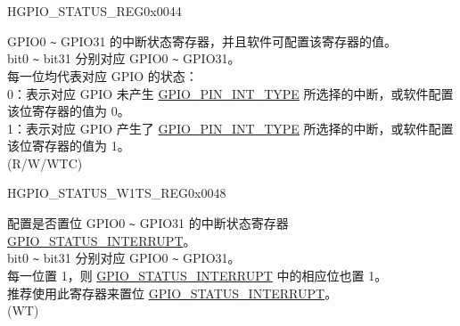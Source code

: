 \begin{register}{H}{GPIO\_STATUS\_REG}{0x0044}\label{regdesc:GPIOSTATUSREG}
%
\regnewline%
\begin{regdesc}\begin{reglist}
\label{fielddesc:GPIOSTATUSINTERRUPT}\item [GPIO\_STATUS\_INTERRUPT] GPIO0 \verb+~+ GPIO31 的中断状态寄存器，并且软件可配置该寄存器的值。\\
bit0 \verb+~+ bit31 分别对应 GPIO0 \verb+~+ GPIO31。\\
每一位均代表对应 GPIO 的状态：\\
0：表示对应 GPIO 未产生  \hyperref[fielddesc:GPIOPINNINTTYPE]{GPIO\_PIN\_INT\_TYPE} 所选择的中断，或软件配置该位寄存器的值为 0。\\
1：表示对应 GPIO 产生了  \hyperref[fielddesc:GPIOPINNINTTYPE]{GPIO\_PIN\_INT\_TYPE} 所选择的中断，或软件配置该位寄存器的值为 1。\\
(R/W/WTC)
\end{reglist}\end{regdesc}
\end{register}


\begin{register}{H}{GPIO\_STATUS\_W1TS\_REG}{0x0048}\label{regdesc:GPIOSTATUSW1TSREG}
%
\regnewline%
\begin{regdesc}\begin{reglist}
\label{fielddesc:GPIOSTATUSW1TS}\item [GPIO\_STATUS\_W1TS] 配置是否置位 GPIO0 \verb+~+ GPIO31 的中断状态寄存器 \hyperref[fielddesc:GPIOSTATUSINTERRUPT]{GPIO\_STATUS\_INTERRUPT}。\\
bit0 \verb+~+ bit31 分别对应 GPIO0 \verb+~+ GPIO31。\\
每一位置 1，则  \hyperref[fielddesc:GPIOSTATUSINTERRUPT]{GPIO\_STATUS\_INTERRUPT} 中的相应位也置 1。\\
推荐使用此寄存器来置位  \hyperref[fielddesc:GPIOSTATUSINTERRUPT]{GPIO\_STATUS\_INTERRUPT}。\\
(WT)
\end{reglist}\end{regdesc}
\end{register}


